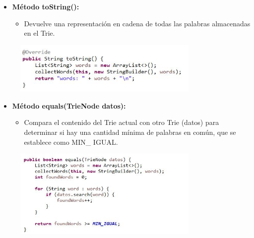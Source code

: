 \documentclass{article}
\begin{document}
	\begin{itemize}
	\item \textbf{Método toString():}
	 \begin{itemize}
	 \item Devuelve una representación en cadena de todas las palabras almacenadas en el Trie.
	 \end{itemize}
	\end{itemize}
	 \begin{figure}[H]
		\centering
		\includegraphics[width=0.8\textwidth,keepaspectratio]{img/TN6.jpg}
	\end{figure}
	
	\begin{itemize}
	\item \textbf{Método equals(TrieNode datos):}
	 \begin{itemize}
	 \item Compara el contenido del Trie actual con otro Trie (datos) para determinar si hay una cantidad mínima de palabras en común, que se establece como MIN\_ IGUAL.
	 \end{itemize}
	\end{itemize}
	 \begin{figure}[H]
		\centering
		\includegraphics[width=0.8\textwidth,keepaspectratio]{img/TN7.jpg}
	\end{figure}
	\clearpage
	
\end{document}
